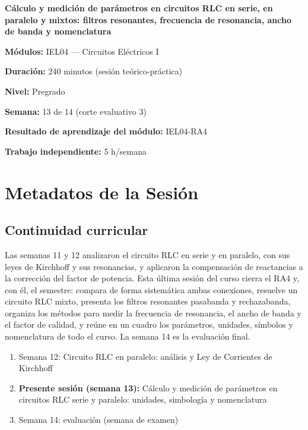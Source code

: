 \documentclass[11pt,letterpaper]{article}
\begin{document}
\begin{cabecera}
{\color{iubyellow}\Large\bfseries Cálculo y medición de parámetros en circuitos RLC en serie, en paralelo y mixtos: filtros resonantes, frecuencia de resonancia, ancho de banda y nomenclatura\par}
\vspace{0.6em}
\small
\textbf{\color{iubyellow}Módulos:} IEL04 --- Circuitos Eléctricos I\par
\textbf{\color{iubyellow}Duración:} 240 minutos (sesión teórico-práctica)\par
\textbf{\color{iubyellow}Nivel:} Pregrado\par
\textbf{\color{iubyellow}Semana:} 13 de 14 (corte evaluativo 3)\par
\textbf{\color{iubyellow}Resultado de aprendizaje del módulo:} IEL04-RA4\par
\textbf{\color{iubyellow}Trabajo independiente:} 5 h/semana\par
\end{cabecera}

\section{Metadatos de la Sesión}

\subsection{Continuidad curricular}

Las semanas 11 y 12 analizaron el circuito RLC en serie y en paralelo, con sus leyes de Kirchhoff y sus resonancias, y aplicaron la compensación de reactancias a la corrección del factor de potencia. Esta última sesión del curso cierra el RA4 y, con él, el semestre: compara de forma sistemática ambas conexiones, resuelve un circuito RLC mixto, presenta los filtros resonantes pasabanda y rechazabanda, organiza los métodos para medir la frecuencia de resonancia, el ancho de banda y el factor de calidad, y reúne en un cuadro los parámetros, unidades, símbolos y nomenclatura de todo el curso. La semana 14 es la evaluación final.

\begin{enumerate}
  \item Semana 12: Circuito RLC en paralelo: análisis y Ley de Corrientes de Kirchhoff
  \item \textbf{Presente sesión (semana 13):} Cálculo y medición de parámetros en circuitos RLC serie y paralelo: unidades, simbología y nomenclatura
  \item Semana 14: evaluación (semana de examen)
\end{enumerate}
\end{document}
